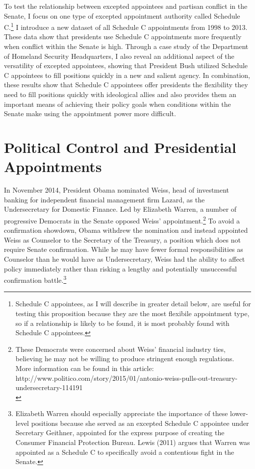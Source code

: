 \documentclass[12pt]{article}
\begin{document}
	To test the relationship between excepted appointees and partisan conflict in the Senate, I focus on one type of excepted appointment authority called Schedule C.\footnote{Schedule C appointees, as I will describe in greater detail below, are useful for testing this proposition because they are the most flexibile appointment type, so if a relationship is likely to be found, it is most probably found with Schedule C appointees.} I introduce a new dataset of all Schedule C appointments from 1998 to 2013. These data show that presidents use Schedule C appointments more frequently when conflict within the Senate is high. Through a case study of the Department of Homeland Security Headquarters, I also reveal an additional aspect of the versatility of excepted appointees, showing that President Bush utilized Schedule C appointees to fill positions quickly in a new and salient agency. In combination, these results show that Schedule C appointees offer presidents the flexibility they need to fill positions quickly with ideological allies and also provides them an important means of achieving their policy goals when conditions within the Senate make using the appointment power more difficult.

\section*{Political Control and Presidential Appointments}
In November 2014, President Obama nominated Weiss, head of investment banking for independent financial management firm Lazard, as the Undersecretary for Domestic Finance. Led by Elizabeth Warren, a number of progressive Democrats in the Senate opposed Weiss' appointment.\footnote{ These Democrats were concerned about Weiss' financial industry ties, believing he may not be willing to produce stringent enough regulations. More information can be found in this article: http://www.politico.com/story/2015/01/antonio-weiss-pulls-out-treasury-undersecretary-114191\\} To avoid a confirmation showdown, Obama withdrew the nomination and instead appointed Weiss as Counselor to the Secretary of the Treasury, a position which does not require Senate confirmation. While he may have fewer formal responsibilities as Counselor than he would have as Undersecretary, Weiss had the ability to affect policy immediately rather than risking a lengthy and potentially unsuccessful confirmation battle.\footnote{Elizabeth Warren should especially appreciate the importance of these lower-level positions because she served as an excepted Schedule C appointee under Secretary Geithner, appointed for the express purpose of creating the Consumer Financial Protection Bureau. Lewis (2011) argues that Warren was appointed as a Schedule C to specifically avoid a contentious fight in the Senate.}
	
\end{document}
